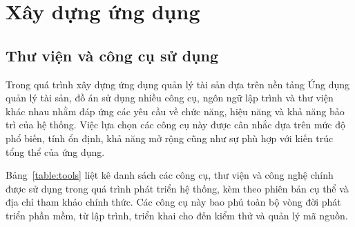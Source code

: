\documentclass[../DoAn.tex]{subfiles}
\begin{document}
\section{Xây dựng ứng dụng}
\subsection{Thư viện và công cụ sử dụng}

Trong quá trình xây dựng ứng dụng quản lý tài sản dựa trên nền tảng Ứng dụng quản lý tài sản, đồ án sử dụng nhiều công cụ, ngôn ngữ lập trình và thư viện khác nhau nhằm đáp ứng các yêu cầu về chức năng, hiệu năng và khả năng bảo trì của hệ thống. Việc lựa chọn các công cụ này được cân nhắc dựa trên mức độ phổ biến, tính ổn định, khả năng mở rộng cũng như sự phù hợp với kiến trúc tổng thể của ứng dụng.

Bảng~\ref{table:tools} liệt kê danh sách các công cụ, thư viện và công nghệ chính được sử dụng trong quá trình phát triển hệ thống, kèm theo phiên bản cụ thể và địa chỉ tham khảo chính thức. Các công cụ này bao phủ toàn bộ vòng đời phát triển phần mềm, từ lập trình, triển khai cho đến kiểm thử và quản lý mã nguồn.
\end{document}
